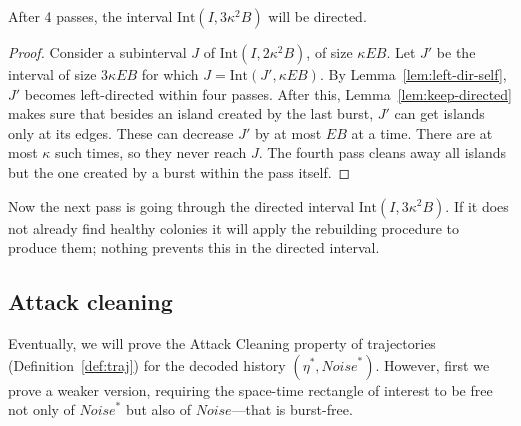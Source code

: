 \documentclass[11pt]{memoir}
\theoremstyle{definition} %
\def\B{B}
\newcommand{\E}{E}
\newcommand{\Int}{\mathrm{Int}}
\newcommand{\Noise}{\mathit{Noise}}
\begin{document}
\begin{lemma}
  After 4 passes,  the interval \( \Int(I,3\kappa^{2}\B) \) will be directed.
\end{lemma}
\begin{proof}
  Consider a subinterval \( J \) of \( \Int(I,2\kappa^{2}\B) \), of size \( \kappa\E\B \).
  Let \( J' \) be the interval of size \( 3\kappa\E\B \) for which \( J=\Int(J',\kappa\E\B) \).
  By Lemma~\ref{lem:left-dir-self}, \( J' \) becomes left-directed within four passes.
  After this, Lemma~\ref{lem:keep-directed} makes sure that besides an island created by the last
  burst, \( J' \) can get islands only at its edges.
  These can decrease \( J' \) by at most \( \E\B \) at a time.
  There are at most \( \kappa \) such times, so they never reach \( J \).
  The fourth pass cleans away all islands but the one created by a burst within the pass itself.
\end{proof}

Now the next pass is going through the directed interval \( \Int(I,3\kappa^{2}\B) \).
If it does not already find healthy colonies it will apply the rebuilding procedure to produce them; 
nothing prevents this in the directed interval.




\subsection{Attack cleaning}

Eventually, we will prove the Attack Cleaning property of trajectories (Definition~\ref{def:traj}) for the 
decoded history \( (\eta^{*},\Noise^{*}) \).
However, first we prove a weaker version, requiring the space-time rectangle of interest to be free
not only of \( \Noise^{*} \) but also of \( \Noise \)---that is burst-free.
\end{document}
